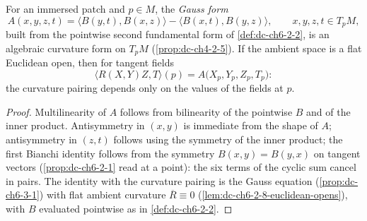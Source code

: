 \begin{lemma}
  \label{lem:dc-ch6-2-7-gauss-form}
  \leanok
  For an immersed patch and $p\in M$, the \emph{Gauss form}
  $$
  A(x,y,z,t)=\langle B(y,t),B(x,z)\rangle-\langle B(x,t),B(y,z)\rangle,
  \qquad x,y,z,t\in T_pM,
  $$
  built from the pointwise second fundamental form of \cref{def:dc-ch6-2-2},
  is an algebraic curvature form on $T_pM$ (\cref{prop:dc-ch4-2-5}). If the
  ambient space is a flat Euclidean open, then for tangent fields
  $$
  \langle R(X,Y)Z,T\rangle(p)=A\bigl(X_p,Y_p,Z_p,T_p\bigr):
  $$
  the curvature pairing depends only on the values of the fields at $p$.
\end{lemma}
\begin{proof}
  \leanok
  \sketch
  Multilinearity of $A$ follows from bilinearity of the pointwise $B$ and of
  the inner product. Antisymmetry in $(x,y)$ is immediate from the shape of
  $A$; antisymmetry in $(z,t)$ follows using the symmetry of the inner
  product; the first Bianchi identity follows from the symmetry
  $B(x,y)=B(y,x)$ on tangent vectors (\cref{prop:dc-ch6-2-1} read at a
  point): the six terms of the cyclic sum cancel in pairs. The identity with
  the curvature pairing is the Gauss equation (\cref{prop:dc-ch6-3-1}) with
  flat ambient curvature $\overline{R}\equiv 0$
  (\cref{lem:dc-ch6-2-8-euclidean-opens}), with $B$ evaluated pointwise as in
  \cref{def:dc-ch6-2-2}.
\end{proof}

